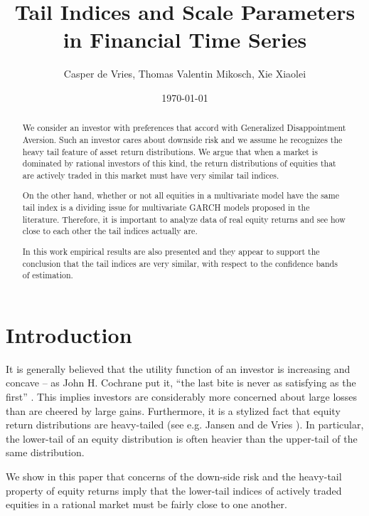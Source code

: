 \documentclass{article}
\title{Tail Indices and Scale Parameters in Financial Time Series}
\author{Casper de Vries, Thomas Valentin Mikosch, Xie Xiaolei}
\date{\today}
\begin{document}
\maketitle

\begin{abstract}
We consider an investor with preferences that accord with Generalized
Disappointment Aversion. Such an investor cares about downside risk and
we assume he recognizes the heavy tail feature of asset return
distributions. We argue that when a market is dominated by rational
investors of this kind, the return distributions of equities that are
actively traded in this market must have very similar tail indices.

On the other hand, whether or not all equities in a multivariate model
have the same tail index is a dividing issue for multivariate GARCH
models proposed in the literature. Therefore, it is important to analyze
data of real equity returns and see how close to each other the
tail indices actually are.

In this work empirical results are also presented and they appear
to support the conclusion that the tail indices are very similar,
with respect to the confidence bands of estimation.
\end{abstract}

\section{Introduction}
It is generally believed that the utility function of an
investor is increasing and concave -- as John H. Cochrane
put it, ``the last bite is never as satisfying as the first''
\cite{cochrane2009asset}. This implies investors are considerably
more concerned about large losses than are cheered by large gains.
Furthermore, it is a stylized fact that equity return distributions
are heavy-tailed (see e.g. Jansen and de Vries \cite{jansen1991frequency}).
In particular, the lower-tail of an equity distribution is often heavier
than the upper-tail of the same distribution.

We show in this paper that concerns of the down-side risk and the
heavy-tail property of equity returns  imply that the lower-tail indices
of actively traded equities in a rational market must be fairly close to
one another.

\end{document}
